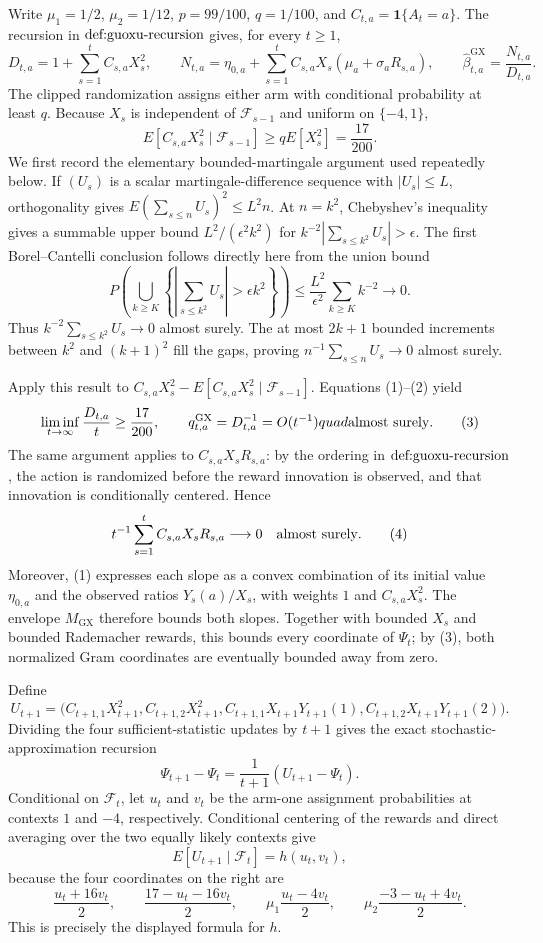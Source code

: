 Write \(\mu _1=1/2\), \(\mu _2=1/12\), \(p=99/100\), \(q=1/100\), and \(C_{t,a}=\mathbf 1\{A_t=a\}\).  The recursion in \(\textnormal{def:guoxu-recursion}\) gives, for every \(t\geq 1\),
\[
 D_{t,a}=1+\sum_{s=1}^t C_{s,a}X_s^2,\qquad
 N_{t,a}=\eta_{0,a}+\sum_{s=1}^t C_{s,a}X_s(\mu_a+\sigma_aR_{s,a}),\qquad
 \widehat\beta^{\mathrm{GX}}_{t,a}=\frac{N_{t,a}}{D_{t,a}}. \tag{1}
\]
The clipped randomization assigns either arm with conditional probability at least \(q\).  Because \(X_s\) is independent of \(\mathcal F_{s-1}\) and uniform on \(\{-4,1\}\),
\[
 E[C_{s,a}X_s^2\mid\mathcal F_{s-1}]
 \geq qE[X_s^2]=\frac{17}{200}. \tag{2}
\]
We first record the elementary bounded-martingale argument used repeatedly below.  If \((U_s)\) is a scalar martingale-difference sequence with \(|U_s|\leq L\), orthogonality gives \(E(\sum_{s\leq n}U_s)^2\leq L^2n\).  At \(n=k^2\), Chebyshev's inequality gives a summable upper bound \(L^2/(\epsilon^2k^2)\) for \(k^{-2}|\sum_{s\leq k^2}U_s|>\epsilon\).  The first Borel--Cantelli conclusion follows directly here from the union bound
\[
 P\!\left(\bigcup_{k\geq K}\left\{\left|\sum_{s\leq k^2}U_s\right|>\epsilon k^2\right\}\right)
 \leq \frac{L^2}{\epsilon^2}\sum_{k\geq K}k^{-2}\longrightarrow0.
\]
Thus \(k^{-2}\sum_{s\leq k^2}U_s\to0\) almost surely.  The at most \(2k+1\) bounded increments between \(k^2\) and \((k+1)^2\) fill the gaps, proving \(n^{-1}\sum_{s\leq n}U_s\to0\) almost surely.

Apply this result to \(C_{s,a}X_s^2-E[C_{s,a}X_s^2\mid\mathcal F_{s-1}]\).  Equations (1)--(2) yield
\[
 \liminf_{t\to\infty}\frac{D_{t,a}}t\geq\frac{17}{200},
 \qquad q^{\mathrm{GX}}_{t,a}=D_{t,a}^{-1}=O(t^{-1})quad\hbox{almost surely}. \tag{3}
\]
The same argument applies to \(C_{s,a}X_sR_{s,a}\): by the ordering in \(\textnormal{def:guoxu-recursion}\), the action is randomized before the reward innovation is observed, and that innovation is conditionally centered.  Hence
\[
 t^{-1}\sum_{s=1}^tC_{s,a}X_sR_{s,a}\longrightarrow0
 \quad\hbox{almost surely}. \tag{4}
\]
Moreover, (1) expresses each slope as a convex combination of its initial value \(\eta_{0,a}\) and the observed ratios \(Y_s(a)/X_s\), with weights \(1\) and \(C_{s,a}X_s^2\).  The envelope \(M_{\mathrm{GX}}\) therefore bounds both slopes.  Together with bounded \(X_s\) and bounded Rademacher rewards, this bounds every coordinate of \(\Psi_t\); by (3), both normalized Gram coordinates are eventually bounded away from zero.

Define
\[
 U_{t+1}=\bigl(C_{t+1,1}X_{t+1}^2,C_{t+1,2}X_{t+1}^2,
 C_{t+1,1}X_{t+1}Y_{t+1}(1),C_{t+1,2}X_{t+1}Y_{t+1}(2)\bigr).
\]
Dividing the four sufficient-statistic updates by \(t+1\) gives the exact stochastic-approximation recursion
\[
 \Psi_{t+1}-\Psi_t=\frac1{t+1}(U_{t+1}-\Psi_t). \tag{5}
\]
Conditional on \(\mathcal F_t\), let \(u_t\) and \(v_t\) be the arm-one assignment probabilities at contexts \(1\) and \(-4\), respectively.  Conditional centering of the rewards and direct averaging over the two equally likely contexts give
\[
 E[U_{t+1}\mid\mathcal F_t]=h(u_t,v_t), \tag{6}
\]
because the four coordinates on the right are
\[
 \frac{u_t+16v_t}{2},\qquad \frac{17-u_t-16v_t}{2},\qquad
 \mu_1\frac{u_t-4v_t}{2},\qquad
 \mu_2\frac{-3-u_t+4v_t}{2}.
\]
This is precisely the displayed formula for \(h\).

